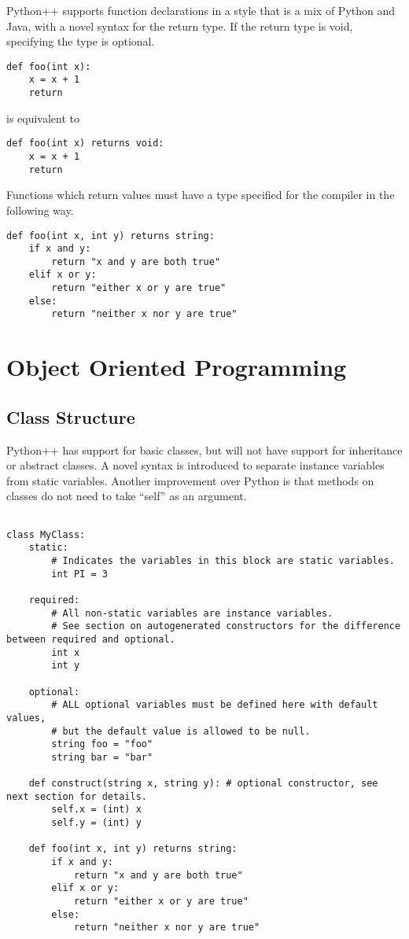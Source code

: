 \documentclass{article}
\begin{document}
Python++ supports function declarations in a style that is a mix of Python and Java, with a novel syntax for the return type. If the return type is void, specifying the type is optional.

\begin{verbatim}
def foo(int x):
    x = x + 1
    return
\end{verbatim}

\noindent is equivalent to

\begin{verbatim}
def foo(int x) returns void:
    x = x + 1
    return
\end{verbatim}

\noindent Functions which return values must have a type specified for the compiler in the following way.

\begin{verbatim}
def foo(int x, int y) returns string:
    if x and y:
        return "x and y are both true"
    elif x or y:
        return "either x or y are true"
    else:
        return "neither x nor y are true"
\end{verbatim}        



\section{Object Oriented Programming}

\subsection{Class Structure}
Python++ has support for basic classes, but will not have support for inheritance or abstract classes. A novel syntax is introduced to separate instance variables from static variables. Another improvement over Python is that methods on classes do not need to take ``self'' as an argument.

\begin{verbatim}

class MyClass:
    static:
        # Indicates the variables in this block are static variables.
        int PI = 3
    
    required:
        # All non-static variables are instance variables.
        # See section on autogenerated constructors for the difference between required and optional.
        int x
        int y
    
    optional:
        # ALL optional variables must be defined here with default values,
        # but the default value is allowed to be null.
        string foo = "foo"
        string bar = "bar"

    def construct(string x, string y): # optional constructor, see next section for details.
        self.x = (int) x
        self.y = (int) y

    def foo(int x, int y) returns string:
        if x and y:
            return "x and y are both true"
        elif x or y:
            return "either x or y are true"
        else:
            return "neither x nor y are true"
\end{verbatim}  
\end{document}

